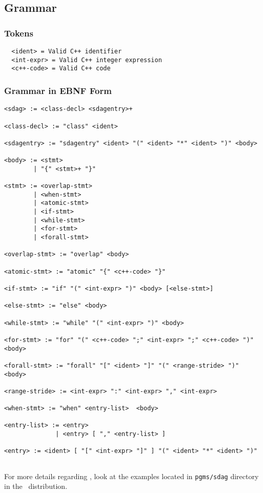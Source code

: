\subsection{Grammar}

\subsubsection{Tokens}

\begin{verbatim}
  <ident> = Valid C++ identifier 
  <int-expr> = Valid C++ integer expression 
  <c++-code> = Valid C++ code 
\end{verbatim}

\subsubsection{Grammar in EBNF Form}

\begin{verbatim}
<sdag> := <class-decl> <sdagentry>+ 

<class-decl> := "class" <ident> 

<sdagentry> := "sdagentry" <ident> "(" <ident> "*" <ident> ")" <body> 

<body> := <stmt> 
        | "{" <stmt>+ "}" 

<stmt> := <overlap-stmt> 
        | <when-stmt> 
        | <atomic-stmt> 
        | <if-stmt> 
        | <while-stmt> 
        | <for-stmt> 
        | <forall-stmt> 

<overlap-stmt> := "overlap" <body> 

<atomic-stmt> := "atomic" "{" <c++-code> "}" 

<if-stmt> := "if" "(" <int-expr> ")" <body> [<else-stmt>] 

<else-stmt> := "else" <body> 

<while-stmt> := "while" "(" <int-expr> ")" <body> 

<for-stmt> := "for" "(" <c++-code> ";" <int-expr> ";" <c++-code> ")" <body> 

<forall-stmt> := "forall" "[" <ident> "]" "(" <range-stride> ")" <body> 

<range-stride> := <int-expr> ":" <int-expr> "," <int-expr> 

<when-stmt> := "when" <entry-list>  <body> 

<entry-list> := <entry> 
              | <entry> [ "," <entry-list> ] 

<entry> := <ident> [ "[" <int-expr> "]" ] "(" <ident> "*" <ident> ")" 
  
\end{verbatim}


For more details regarding \sdag, look at the examples located in
{\tt pgms/sdag} directory in the \charmpp\ distribution.



